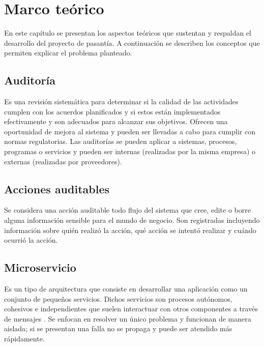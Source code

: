 \chapter{\textbf{Marco teórico}}

\thispagestyle{empty}

En este capítulo se presentan los aspectos teóricos que sustentan y respaldan el desarrollo del proyecto de pasantía. A continuación se describen los conceptos que permiten explicar el problema planteado.

\section{Auditoría}

Es una revisión sistemática para determinar si la calidad de las actividades cumplen con los acuerdos planificados y si estos están implementados efectivamente y son adecuados para alcanzar sus objetivos. Ofrecen una oportunidad de mejora al sistema y pueden ser llevadas a cabo para cumplir con normas regulatorias. Las auditorías se pueden aplicar a sistemas, procesos, programas o servicios y pueden ser internas (realizadas por la misma empresa) o externas (realizadas por proveedores). \cite{weinstein1997total}

\section{Acciones auditables}

Se considera una acción auditable todo flujo del sistema que cree, edite o borre alguna información sensible para el mundo de negocio. Son registradas incluyendo información sobre quién realizó la acción, qué acción se intentó realizar y cuándo ocurrió la acción.

\section{Microservicio}

Es un tipo de arquitectura que consiste en desarrollar una aplicación como un conjunto de pequeños servicios. Dichos servicios son procesos autónomos, cohesivos e independientes que suelen interactuar con otros componentes a través de mensajes \cite{Microservices1}. Se enfocan en resolver un único problema y funcionan de manera aislada; si se presentan una falla no se propaga y puede ser atendido más rápidamente. \cite{Microservices2} \\

